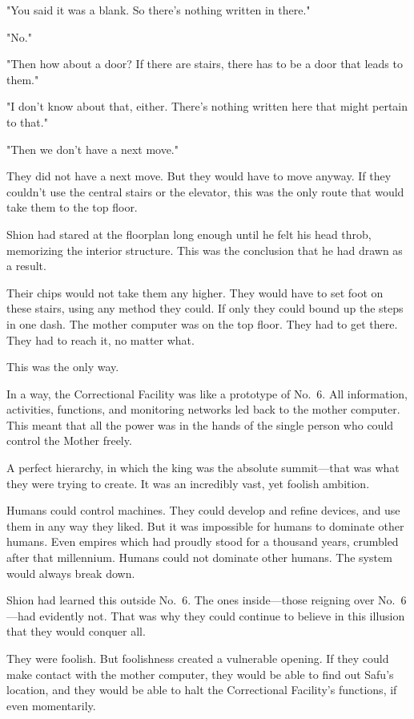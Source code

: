 "You said it was a blank. So there's nothing written in there."

"No."

"Then how about a door? If there are stairs, there has to be a door that
leads to them."

"I don't know about that, either. There's nothing written here that
might pertain to that."

"Then we don't have a next move."

They did not have a next move. But they would have to move anyway. If
they couldn't use the central stairs or the elevator, this was the only
route that would take them to the top floor.

Shion had stared at the floorplan long enough until he felt his head
throb, memorizing the interior structure. This was the conclusion that
he had drawn as a result.

Their chips would not take them any higher. They would have to
set foot on these stairs, using any method they could. If only they
could bound up the steps in one dash. The mother computer was on the top
floor. They had to get there. They had to reach it, no matter what.

This was the only way.

In a way, the Correctional Facility was like a prototype of No.~6. All
information, activities, functions, and monitoring networks led back to
the mother computer. This meant that all the power was in the hands of
the single person who could control the Mother freely.

A perfect hierarchy, in which the king was the absolute summit---that was
what they were trying to create. It was an incredibly vast, yet foolish
ambition.

Humans could control machines. They could develop and refine devices,
and use them in any way they liked. But it was impossible for humans to
dominate other humans. Even empires which had proudly stood for a
thousand years, crumbled after that millennium. Humans could not
dominate other humans. The system would always break down.

Shion had learned this outside No.~6. The ones inside---those reigning
over No.~6---had evidently not. That was why they could continue to
believe in this illusion that they would conquer all.

They were foolish. But foolishness created a vulnerable opening. If they
could make contact with the mother computer, they would be able to find
out Safu's location, and they would be able to halt the Correctional
Facility's functions, if even momentarily.

